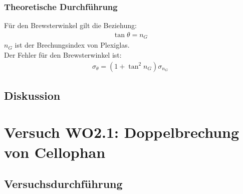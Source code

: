 \documentclass[12pt]{scrartcl}
\begin{document}
\subsubsection{Theoretische Durchführung}
Für den Brewsterwinkel gilt die Beziehung:
\begin{align}
\tan{\theta} = n_G
\end{align}
$n_G$ ist der Brechungsindex von Plexiglas.\\
Der Fehler für den Brewsterwinkel ist:
\begin{align}
\sigma_\theta = (1+\tan^2{n_G})\sigma_{n_G}
\end{align}
\subsection{Diskussion}

\section{Versuch WO2.1:
Doppelbrechung von Cellophan}
\subsection{Versuchsdurchführung}
\end{document}
